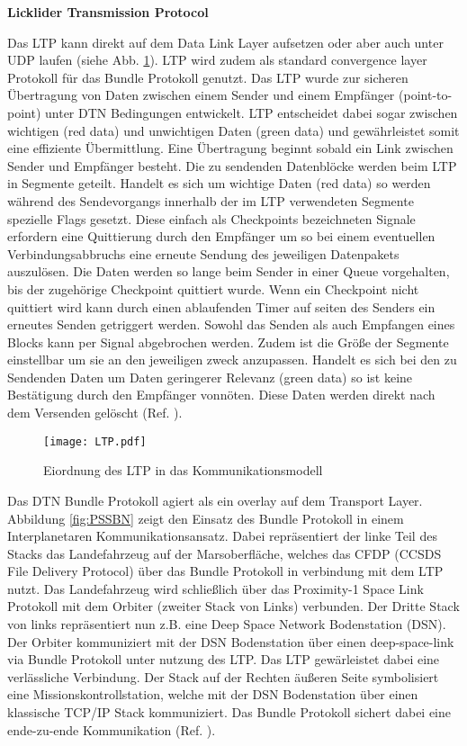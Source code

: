 
\textbf{Licklider Transmission Protocol}

Das LTP kann direkt auf dem Data Link Layer aufsetzen oder aber auch unter UDP
laufen (siehe Abb. \ref{fig:LTP}). LTP wird zudem als standard convergence layer
Protokoll f{\"u}r das Bundle Protokoll genutzt. Das LTP wurde zur sicheren {\"U}bertragung von Daten
zwischen einem Sender und einem Empf{\"a}nger (point-to-point) unter DTN Bedingungen entwickelt. LTP entscheidet dabei sogar zwischen wichtigen
(red data) und unwichtigen Daten (green data) und gew{\"a}hrleistet somit eine
effiziente {\"U}bermittlung. Eine {\"U}bertragung beginnt sobald ein Link zwischen Sender und Empf{\"a}nger
besteht. Die zu sendenden Datenbl{\"o}cke werden beim LTP in Segmente
geteilt. Handelt es sich um wichtige Daten (red data) so werden w{\"a}hrend des
Sendevorgangs innerhalb der im LTP verwendeten Segmente spezielle Flags gesetzt.
Diese einfach als Checkpoints bezeichneten Signale erfordern eine Quittierung durch den Empf{\"a}nger um so bei einem eventuellen
Verbindungsabbruchs eine erneute Sendung des jeweiligen Datenpakets
auszul{\"o}sen. Die Daten werden so lange beim Sender in einer Queue
vorgehalten, bis der zugeh{\"o}rige Checkpoint quittiert wurde. Wenn ein
Checkpoint nicht quittiert wird kann durch einen ablaufenden Timer auf seiten
des Senders ein erneutes Senden getriggert werden. Sowohl das Senden als auch
Empfangen eines Blocks kann per Signal abgebrochen werden. Zudem ist die
Gr{\"o}{\ss}e der Segmente einstellbar um sie an den jeweiligen zweck
anzupassen. Handelt es sich bei den zu Sendenden Daten um Daten geringerer
Relevanz (green data) so ist keine Best{\"a}tigung durch den Empf{\"a}nger
vonn{\"o}ten.
Diese Daten werden direkt nach dem Versenden gel{\"o}scht (Ref. \cite{web4}).

\begin{figure}[H]
\centering
\texttt{[image: LTP.pdf]}
\caption{Eiordnung des LTP in das Kommunikationsmodell}
\label{fig:LTP}
\end{figure}

Das DTN Bundle Protokoll agiert als ein overlay auf dem Transport
Layer. Abbildung \ref{fig:PSSBN} zeigt den Einsatz des Bundle Protokoll in einem
Interplanetaren Kommunikationsansatz. Dabei repr{\"a}sentiert der linke Teil des
Stacks das Landefahrzeug auf der Marsoberfl{\"a}che, welches das CFDP (CCSDS
File Delivery Protocol) {\"u}ber das Bundle Protokoll in verbindung mit dem LTP
nutzt.
Das Landefahrzeug wird schlie{\ss}lich {\"u}ber das Proximity-1 Space Link
Protokoll mit dem Orbiter (zweiter Stack von Links) verbunden. Der Dritte Stack von links
repr{\"a}sentiert nun z.B. eine Deep Space Network Bodenstation (DSN). Der
Orbiter kommuniziert mit der DSN Bodenstation {\"u}ber einen deep-space-link via
Bundle Protokoll unter nutzung des LTP. Das LTP gew{\"a}rleistet dabei eine
verl{\"a}ssliche Verbindung. Der Stack auf der Rechten {\"a}u{\ss}eren Seite
symbolisiert eine Missionskontrollstation, welche mit der DSN Bodenstation
{\"u}ber einen klassische TCP/IP Stack kommuniziert. Das Bundle Protokoll
sichert dabei eine ende-zu-ende Kommunikation (Ref. \cite{DTNBundle}).

